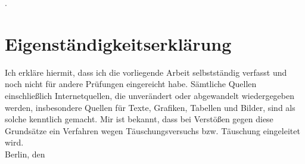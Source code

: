 \phantom.
\vspace{3cm}
\section*{Eigenst\"andigkeitserkl\"arung}

Ich erkläre hiermit, dass ich die vorliegende Arbeit selbstst\"andig verfasst und noch nicht für andere Pr\"ufungen eingereicht habe. S\"amtliche Quellen einschließlich
Internetquellen, die unverändert oder abgewandelt wiedergegeben werden,
insbesondere Quellen für Texte, Grafiken, Tabellen und Bilder, sind als solche
kenntlich gemacht. Mir ist bekannt, dass bei Verstößen gegen diese Grunds\"atze
ein Verfahren wegen T\"auschungsversuchs bzw. T\"auschung eingeleitet wird.\\[10pt]

\noindent Berlin, den